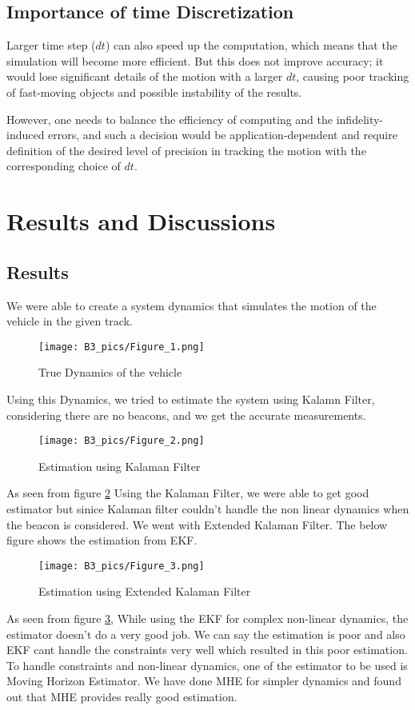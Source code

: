\documentclass[a4paper,11pt]{article}
\begin{document}
\subsection*{Importance of time Discretization}
Larger time step ($dt$) can also speed up the computation, which means that the simulation will become more efficient. But this does not improve accuracy; it would lose significant details of the motion with a larger $dt$, causing poor tracking of fast-moving objects and possible instability of the results.

However, one needs to balance the efficiency of computing and the infidelity-induced errors, and such a decision would be application-dependent and require definition of the desired level of precision in tracking the motion with the corresponding choice of $dt$.

\section*{Results and Discussions}

\subsection*{Results}
We were able to create a system dynamics that simulates the motion of the vehicle in the given track.

\begin{figure} [H]
    \centering
    \texttt{[image: B3\_pics/Figure\_1.png]}
    \caption{True Dynamics of the vehicle}
    \label{fig:1}
\end{figure}

Using this Dynamics, we tried to estimate the system using Kalamn Filter, considering there are no beacons, and we get the accurate measurements.
\begin{figure} [H]
    \centering
    \texttt{[image: B3\_pics/Figure\_2.png]}
    \caption{Estimation using Kalaman Filter}
    \label{fig:2}
\end{figure}

 As seen from figure \ref{fig:2} Using the Kalaman Filter, we were able to get good estimator but sinice Kalaman filter couldn't handle the non linear dynamics when the beacon is considered. We went with Extended Kalaman Filter. The below figure shows the estimation from EKF.

\begin{figure} [H]
    \centering
    \texttt{[image: B3\_pics/Figure\_3.png]}
    \caption{Estimation using Extended Kalaman Filter}
    \label{fig:3}
\end{figure}
As seen from figure \ref{fig:3}, While using the EKF for complex non-linear dynamics, the estimator doesn't do a very good job. We can say the estimation is poor and also EKF cant handle the constraints very well which resulted in this poor estimation.
To handle constraints and non-linear dynamics, one of the estimator to be used is Moving Horizon Estimator. We have done MHE for simpler dynamics and found out that MHE provides really good estimation.
\end{document}
